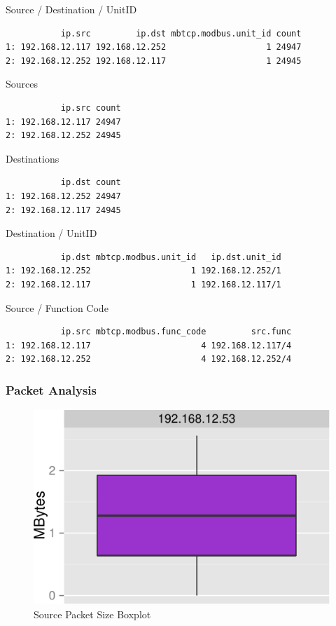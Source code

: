 \documentclass[12pt,]{article}
\begin{document}
\newpage

Source / Destination / UnitID

\begin{verbatim}
           ip.src         ip.dst mbtcp.modbus.unit_id count
1: 192.168.12.117 192.168.12.252                    1 24947
2: 192.168.12.252 192.168.12.117                    1 24945
\end{verbatim}

Sources

\begin{verbatim}
           ip.src count
1: 192.168.12.117 24947
2: 192.168.12.252 24945
\end{verbatim}

Destinations

\begin{verbatim}
           ip.dst count
1: 192.168.12.252 24947
2: 192.168.12.117 24945
\end{verbatim}

Destination / UnitID

\begin{verbatim}
           ip.dst mbtcp.modbus.unit_id   ip.dst.unit_id
1: 192.168.12.252                    1 192.168.12.252/1
2: 192.168.12.117                    1 192.168.12.117/1
\end{verbatim}

Source / Function Code

\begin{verbatim}
           ip.src mbtcp.modbus.func_code         src.func
1: 192.168.12.117                      4 192.168.12.117/4
2: 192.168.12.252                      4 192.168.12.252/4
\end{verbatim}

\newpage

\subsubsection{Packet Analysis}\label{packet-analysis}

\begin{figure}

{\centering \includegraphics{thesis_files/figure-latex/unnamed-chunk-20-1} 

}

\caption{Source Packet Size Boxplot}\label{fig:unnamed-chunk-20}
\end{figure}
\end{document}
